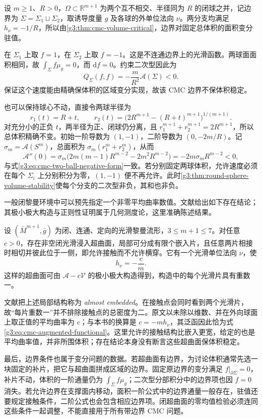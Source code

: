 \begin{example}\label{g3:exm:cmc-two-ball-volume-transfer}
	设 \(m\ge1\)、\(R>0\)，\(\Omega\subset\mathbb R^{m+1}\) 为两个互不相交、半径同为 \(R\) 的闭球之并，记边界为 \(\Sigma=\Sigma_1\sqcup\Sigma_2\)，取诱导度量 \(g\) 及各球的外单位法向 \(\nu\)。两分支均满足 \(h_\nu=-1/R\)，所以由\cref{g3:thm:cmc-volume-critical}，边界对固定总体积的面积变分驻值。

	在 \(\Sigma_1\) 上取 \(f=1\)，在 \(\Sigma_2\) 上取 \(f=-1\)。这是不连通边界上的光滑函数。两球面面积相同，故 \(\int_\Sigma f\mu_g=0\)，而 \(\mathrm df=0\)。约束二次型因此为
	\begin{equation}\label{g3:eq:cmc-two-ball-negative-form}
		Q_\Sigma(f,f)=-\frac m{R^2}\mathcal A(\Sigma)<0.
	\end{equation}
	保证这个速度能由精确保体积的区域变分实现，故该 CMC 边界不保体积稳定。

	也可以保持球心不动，直接令两球半径为
	\[
		r_1(t)=R+t,\qquad
		r_2(t)=\bigl(2R^{m+1}-(R+t)^{m+1}\bigr)^{1/(m+1)}.
	\]
	对充分小的正负 \(t\)，两半径为正、闭球仍分离，且 \(r_1^{m+1}+r_2^{m+1}=2R^{m+1}\)，所以总体积精确不变。初始一阶导数为 \((1,-1)\)，二阶导数为 \((0,-2m/R)\)。记 \(\sigma_m=\mathcal A(S^m)\)，总面积为 \(\sigma_m(r_1^m+r_2^m)\)，从而
	\[
		\mathcal A''(0)
		=\sigma_m\bigl(2m(m-1)R^{m-2}-2m^2R^{m-2}\bigr)
		=-2m\sigma_mR^{m-2}<0,
	\]
	与式\eqref{g3:eq:cmc-two-ball-negative-form}一致。若分别固定两球体积，允许速度必须在每个 \(\Sigma_i\) 上分别积分为零，\((1,-1)\) 便不再允许。此时\cref{g3:thm:round-sphere-volume-stability}使每个分支的二次型非负，其和也非负。
\end{example}

\ProseParagraphBreak

一般闭黎曼环境中可以预先指定一个非零平均曲率数值。文献\cite[作者版本（2017年8月11日）定理0.1、注0.2及第1节]{ZhouZhu2019CMC}给出如下存在结论；其极小极大构造与正则性证明属于几何测度论，这里准确陈述结果。

\begin{theorem}\label{g3:thm:cmc-minmax-external}
	设 \((\bar M^{m+1},\bar g)\) 为闭、连通、定向的光滑黎曼流形，\(3\le m+1\le7\)。对任意 \(c>0\)，存在非空闭光滑浸入超曲面，局部可分成有限个嵌入片，且任意两片相接时相切并彼此位于一侧，即允许接触而不允许横穿。它有一个光滑单位法向 \(\nu\)，使
	\[
		h_\nu=-\frac cm.
	\]
	这样的超曲面可由 \(\mathcal A-c\mathcal V\) 的极小极大构造得到，构造中的每个光滑片具有重数一。
\end{theorem}

文献把上述局部结构称为 \emph{almost embedded}。在接触点会同时看到两个光滑片，故“每片重数一”并不排除接触点的总密度为二。原文以未除以维数、并在外向球面上取正值的平均曲率为 \(c\)；与本书的换算是 \(c=-m h_\nu\)，其泛函因此恰为式\eqref{g3:eq:cmc-augmented-functional}。这里允许的接触结构比嵌入更宽，给定的也是平均曲率值，并非所围体积；存在结论本身没有断言这些超曲面保体积稳定。

\ProseParagraphBreak

最后，边界条件也属于变分问题的数据。若超曲面有边界，为讨论体积通常先选一块固定的补片，把它与超曲面拼成区域的边界。固定原边界的变分满足 \(f|_{\partial\Sigma}=0\)，补片不动，体积的一阶通量仍为 \(\int_\Sigma f\mu_g\)；二次型分部积分中的边界项也因 \(f=0\) 消失。若允许边界在支撑面内移动，面积一阶公式中的边界通量一般存在，驻值还要规定接触条件，二阶公式也会包含相应边界项。闭超曲面的零均值检验必须连同这些条件一起调整，不能直接用于所有带边界 CMC 问题。
